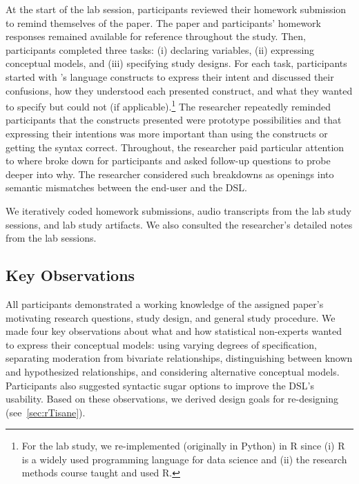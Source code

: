 
At the start of the lab session, participants reviewed their homework submission
to remind themselves of the paper. The paper and participants' homework
responses remained available for reference throughout the study. Then,
participants completed three tasks: (i) declaring variables, (ii) expressing
conceptual models, and (iii) specifying study designs. For each task,
participants started with \tisane's language constructs to express their intent
and discussed their confusions, how they understood each presented construct,
and what they wanted to specify but could not (if applicable).\footnote{For the
lab study, we re-implemented \tisane (originally in Python) in R since (i) R is
a widely used programming language for data science and (ii) the research
methods course taught and used R.} The researcher repeatedly reminded
participants that the constructs presented were prototype possibilities and that
expressing their intentions was more important than using the constructs or
getting the syntax correct. Throughout, the researcher paid particular attention
to where \tisane broke down for participants and asked follow-up questions to
probe deeper into why. The researcher considered such breakdowns as openings
into semantic mismatches between the end-user and the DSL.

We iteratively coded homework submissions, audio transcripts from the lab study
sessions, and lab study artifacts. We also consulted the
researcher's detailed notes from the lab sessions. 


\subsection{Key Observations}
All participants demonstrated a working knowledge of the assigned paper's
motivating research questions, study design, and general study procedure. 
We made four key observations about what and how statistical non-experts wanted
to express their conceptual models: using varying degrees of specification,
separating moderation from bivariate relationships, distinguishing between known
and hypothesized relationships, and considering alternative conceptual models.
Participants also suggested syntactic sugar options to improve the DSL's
usability. Based on these observations, we derived design goals for re-designing
\tisane (see~\autoref{sec:rTisane}).

